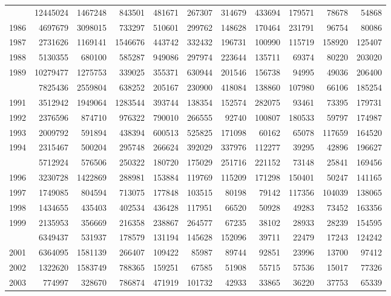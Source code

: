 \documentclass[
]{article}
\begin{document}
\begin{longtable}[t]{lrrrrrrrrrr}
\addlinespace
1985 & 12445024 & 1467248 & 843501 & 481671 & 267307 & 314679 & 433694 & 179571 & 78678 & 54868\\
1986 & 4697679 & 3098015 & 733297 & 510601 & 299762 & 148628 & 170464 & 231791 & 96754 & 80086\\
1987 & 2731626 & 1169141 & 1546676 & 443742 & 332432 & 196731 & 100990 & 115719 & 158920 & 125407\\
1988 & 5130355 & 680100 & 585287 & 949086 & 297974 & 223644 & 135711 & 69374 & 80220 & 203020\\
1989 & 10279477 & 1275753 & 339025 & 355371 & 630944 & 201546 & 156738 & 94995 & 49036 & 206400\\
\addlinespace
1990 & 7825436 & 2559804 & 638252 & 205167 & 230900 & 418084 & 138860 & 107980 & 66106 & 185254\\
1991 & 3512942 & 1949064 & 1283544 & 393744 & 138354 & 152574 & 282075 & 93461 & 73395 & 179731\\
1992 & 2376596 & 874710 & 976322 & 790010 & 266555 & 92740 & 100807 & 180533 & 59797 & 174987\\
1993 & 2009792 & 591894 & 438394 & 600513 & 525825 & 171098 & 60162 & 65078 & 117659 & 164520\\
1994 & 2315467 & 500204 & 295748 & 266624 & 392029 & 337976 & 112277 & 39295 & 42896 & 196627\\
\addlinespace
1995 & 5712924 & 576506 & 250322 & 180720 & 175029 & 251716 & 221152 & 73148 & 25841 & 169456\\
1996 & 3230728 & 1422869 & 288981 & 153884 & 119769 & 115209 & 171298 & 150401 & 50247 & 141165\\
1997 & 1749085 & 804594 & 713075 & 177848 & 103515 & 80198 & 79142 & 117356 & 104039 & 138065\\
1998 & 1434655 & 435403 & 402534 & 436428 & 117951 & 66520 & 50928 & 49283 & 73452 & 163356\\
1999 & 2135953 & 356669 & 216358 & 238867 & 264577 & 67235 & 38102 & 28933 & 28239 & 154595\\
\addlinespace
2000 & 6349437 & 531937 & 178579 & 131194 & 145628 & 152096 & 39711 & 22479 & 17243 & 124242\\
2001 & 6364095 & 1581139 & 266407 & 109422 & 85987 & 89744 & 92851 & 23996 & 13700 & 97412\\
2002 & 1322620 & 1583749 & 788365 & 159251 & 67585 & 51908 & 55715 & 57536 & 15017 & 77326\\
2003 & 774997 & 328670 & 786874 & 471919 & 101732 & 42933 & 33865 & 36220 & 37753 & 65339\\

\end{longtable}
\end{document}
